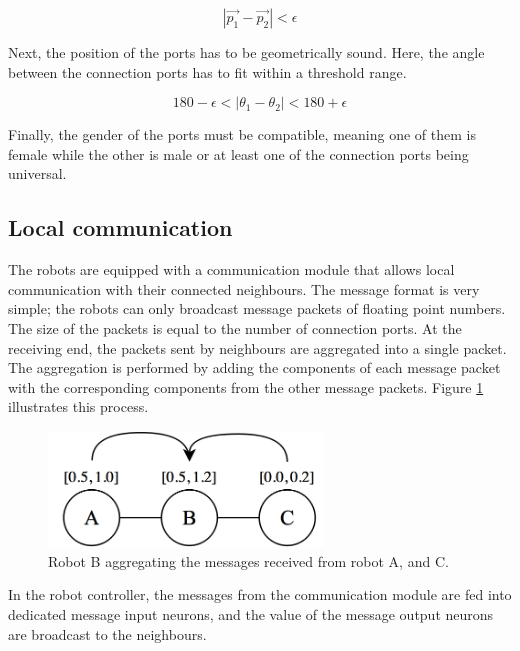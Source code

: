 \begin{equation}
|\vec{p_1} - \vec{p_2}| < \epsilon
\end{equation}

Next, the position of the ports has to be geometrically sound.
Here, the angle between the connection ports has to fit within a threshold range.

\begin{equation}
180 - \epsilon < |\theta_1 - \theta_2| < 180 + \epsilon
\end{equation}

Finally, the gender of the ports must be compatible, meaning one of them is female while the other is male or at least one of the connection ports being universal.
		
\subsection{Local communication}
\label{sec:local_comm}
The robots are equipped with a communication module that allows local communication with their connected neighbours.
The message format is very simple; the robots can only broadcast message packets of floating point numbers.
The size of the packets is equal to the number of connection ports.
At the receiving end, the packets sent by neighbours are aggregated into a single packet.
The aggregation is performed by adding the components of each message packet with the corresponding components from the other message packets. Figure \ref{fig:local_communication} illustrates this process.

\begin{figure}[H]
	\centering
	\includegraphics[width=0.65\textwidth]{chapters/res/Local_communication.png}
	\caption{Robot B aggregating the messages received from robot A, and C.}
	\label{fig:local_communication}
\end{figure}

In the robot controller, the messages from the communication module are fed into dedicated message input neurons, and the value of the message output neurons are broadcast to the neighbours.

